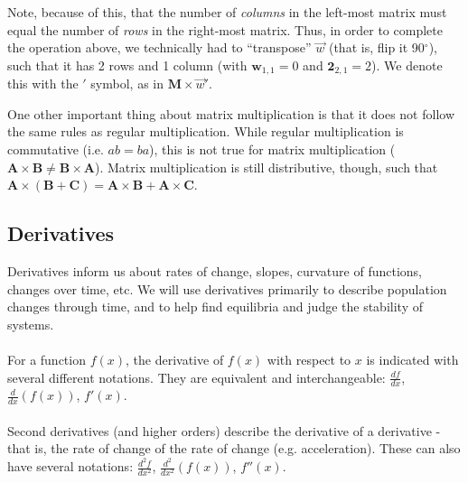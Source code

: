 \documentclass[12pt]{article}
\begin{document}
Note, because of this, that the number of \textit{columns} in the left-most matrix must equal the number of \textit{rows} in the right-most matrix. Thus, in order to complete the operation above, we technically had to ``transpose'' $\overrightarrow{w}$ (that is, flip it 90$^{\circ}$), such that it has 2 rows and 1 column (with $\textbf{w}_{1,1} = 0$ and $\textbf{2}_{2,1} = 2$). We denote this with the $'$ symbol, as in $\textbf{M}\times\overrightarrow{w}'$.

One other important thing about matrix multiplication is that it does not follow the same rules as regular multiplication. While regular multiplication is commutative (i.e. $ab = ba$), this is not true for matrix multiplication ($\textbf{A}\times\textbf{B}\neq\textbf{B}\times\textbf{A}$). Matrix multiplication is still distributive, though, such that $\textbf{A}\times(\textbf{B}+\textbf{C}) = \textbf{A}\times\textbf{B}+\textbf{A}\times\textbf{C}$.

\subsection{Derivatives}
Derivatives inform us about rates of change, slopes, curvature of functions, changes over time, etc. We will use derivatives primarily to describe population changes through time, and to help find equilibria and judge the stability of systems.

\paragraph{} For a function $f(x)$, the derivative of $f(x)$ with respect to $x$ is indicated with several different notations. They are equivalent and interchangeable: $\frac{df}{dx}$, $\frac{d}{dx}(f(x))$, $f'(x)$.

\paragraph{} Second derivatives (and higher orders) describe the derivative of a derivative - that is, the rate of change of the rate of change (e.g. acceleration). These can also have several notations: $\frac{d^{2}f}{dx^{2}}$, $\frac{d^{2}}{dx^{2}}(f(x))$, $f''(x)$.
\end{document}

